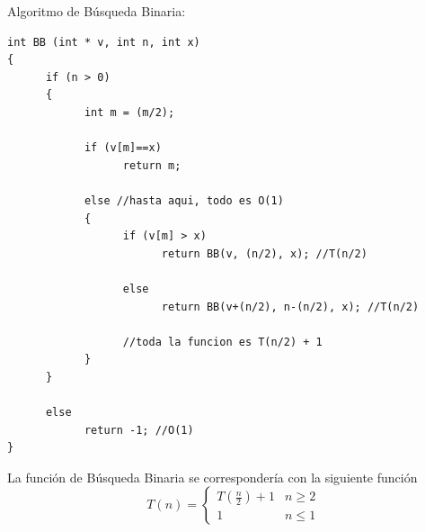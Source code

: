 \documentclass[10pt,a4paper,spanish]{report}
\begin{document}
\newpage

\noindent
Algoritmo de Búsqueda Binaria:
\begin{verbatim}
int BB (int * v, int n, int x)
{
      if (n > 0)
      {
            int m = (m/2);

            if (v[m]==x)
                  return m;

            else //hasta aqui, todo es O(1)
            {
                  if (v[m] > x)
                        return BB(v, (n/2), x); //T(n/2)

                  else
                        return BB(v+(n/2), n-(n/2), x); //T(n/2)

                  //toda la funcion es T(n/2) + 1
            }
      }

      else
            return -1; //O(1)
}
\end{verbatim}

\noindent
La función de Búsqueda Binaria se correspondería con la siguiente función
\begin{displaymath}
T(n) = \left\{ \begin{array}{ll}
T(\frac{n}{2})+1  &  n \geq 2\\
1         &  n \leq 1
\end{array} \right.
\end{displaymath}
\end{document}
